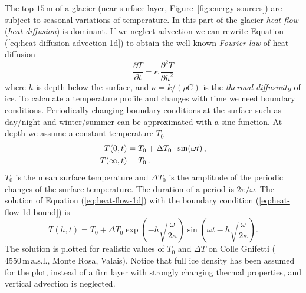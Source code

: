\documentclass[parskip=half]{scrartcl}
\newcommand{\unit}[1]{\ensuremath{\,\mathrm{#1}}}
\newcommand{\s}[1]{\ensuremath{\,\mathrm{#1}}}
\newcommand{\ddt}[1]{\ensuremath{\frac{\partial #1}{\partial t}}}
\begin{document}
The top $15\s{m}$ of a glacier (near surface layer, Figure~\ref{fig:energy-sources}) are subject to seasonal variations of
temperature. In this part of the glacier \emph{heat flow} (\emph{heat
 diffusion}) is dominant.  If we neglect advection we can rewrite Equation
(\ref{eq:heat-diffusion-advection-1d}) to obtain the well known \emph{Fourier
 law} of heat diffusion
%
\begin{equation}
 \label{eq:heat-flow-1d}
  \ddt{T} = \kappa \, \frac{\partial^2T}{\partial h^2}
\end{equation}
%
where $h$ is depth below the surface, and $\kappa=k/(\rho C)$ is the
\emph{thermal diffusivity} of ice.  To calculate a temperature profile and
changes with time we need boundary conditions.  Periodically changing
boundary conditions at the surface such as day/night and winter/summer can be
approximated with a sine function.  At depth we assume a constant temperature
$T_0$
%
\begin{align}
 \label{eq:heat-flow-1d-bound}
  T(0,t)      &= T_0 + \Delta T_0 \cdot \sin(\omega t)\,,  \notag\\
  T(\infty,t) &= T_0\,.
\end{align}
%
$T_0$ is the mean surface temperature and $\Delta T_0$ is the amplitude of the
periodic changes of the surface temperature.  The duration of a period is
$2\pi/\omega$.  The solution of Equation (\ref{eq:heat-flow-1d}) with the
boundary condition (\ref{eq:heat-flow-1d-bound}) is
%
\begin{equation}
 \label{eq:heat-flow-1d-solution}
  T(h,t) = T_0 + \Delta T_0 \exp\left(-h \sqrt{\frac{\omega}{2\kappa}}\right)
           \sin\left(\omega t - h \sqrt{\frac{\omega}{2\kappa}}\right).
\end{equation}
%
The solution is plotted for realistic values of $T_0$ and $\Delta T$ on Colle
Gnifetti ($4550\unit{m} \unit{a.s.l.}$, Monte Rosa, Valais).  Notice that full
ice density has been assumed for the plot, instead of a firn layer with
strongly changing thermal properties, and vertical advection is neglected.
%
\end{document}
